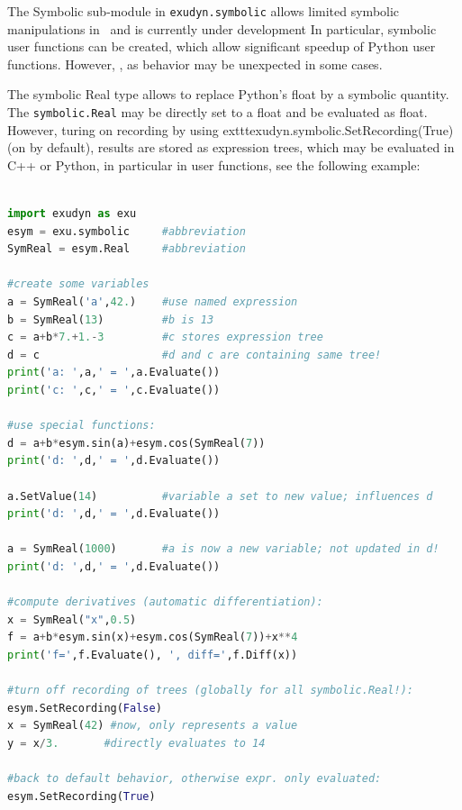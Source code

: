\label{sec:cinterface:symbolic}
The Symbolic sub-module in \texttt{exudyn.symbolic} allows limited symbolic manipulations in \codeName\ and is currently under development In particular, symbolic user functions can be created, which allow significant speedup of Python user functions. However, , as behavior may be unexpected in some cases. 




The symbolic Real type allows to replace Python's float by a symbolic quantity. The \texttt{symbolic.Real} may be directly set to a float and be evaluated as float. However, turing on recording by using 	exttt{exudyn.symbolic.SetRecording(True)} (on by default), results are stored as expression trees, which may be evaluated in C++ or Python, in particular in user functions, see the following example:
\pythonstyle
\begin{lstlisting}[language=Python, firstnumber=1]

import exudyn as exu
esym = exu.symbolic     #abbreviation
SymReal = esym.Real     #abbreviation

#create some variables
a = SymReal('a',42.)    #use named expression
b = SymReal(13)         #b is 13
c = a+b*7.+1.-3         #c stores expression tree
d = c                   #d and c are containing same tree!
print('a: ',a,' = ',a.Evaluate())
print('c: ',c,' = ',c.Evaluate())

#use special functions:
d = a+b*esym.sin(a)+esym.cos(SymReal(7))
print('d: ',d,' = ',d.Evaluate())

a.SetValue(14)          #variable a set to new value; influences d
print('d: ',d,' = ',d.Evaluate())

a = SymReal(1000)       #a is now a new variable; not updated in d!
print('d: ',d,' = ',d.Evaluate())

#compute derivatives (automatic differentiation):
x = SymReal("x",0.5)
f = a+b*esym.sin(x)+esym.cos(SymReal(7))+x**4
print('f=',f.Evaluate(), ', diff=',f.Diff(x))

#turn off recording of trees (globally for all symbolic.Real!):
esym.SetRecording(False)
x = SymReal(42) #now, only represents a value
y = x/3.       #directly evaluates to 14

#back to default behavior, otherwise expr. only evaluated:
esym.SetRecording(True)
\end{lstlisting}


